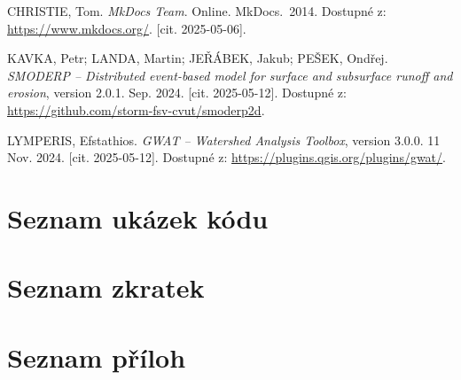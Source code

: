 \documentclass[a4paper,oneside,12pt]{book}
\begin{document}
\begin{thebibliography}{1}
CHRISTIE, Tom. \textit{MkDocs Team}. Online. MkDocs.~2014. Dostupné z: \url{https://www.mkdocs.org/}. [cit. 2025-05-06].

KAVKA, Petr; LANDA, Martin; JEŘÁBEK, Jakub; PEŠEK, Ondřej. \textit{SMODERP – Distributed event-based model for surface and subsurface runoff and erosion}, version 2.0.1. Sep. 2024. [cit. 2025-05-12]. Dostupné z: \url{https://github.com/storm-fsv-cvut/smoderp2d}.

LYMPERIS, Efstathios. \textit{GWAT – Watershed Analysis Toolbox}, version 3.0.0. 11 Nov. 2024. [cit. 2025-05-12]. Dostupné z: \url{https://plugins.qgis.org/plugins/gwat/}.


\end{thebibliography}

\label{list_pics}
\listoffigures

\label{list_tables}
\listoftables
\chapter*{Seznam ukázek kódu} \label{list_code}
\chapter*{Seznam zkratek} \label{list_abr}
\chapter*{Seznam příloh} \label{list_attach}
\end{document}
